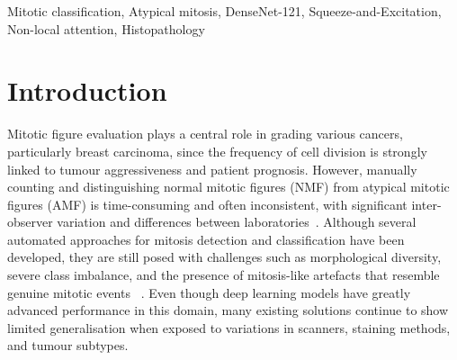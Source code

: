 \documentclass[conference]{IEEEtran}
\begin{document}
\maketitle

\begin{abstract}
Atypical mitotic figures (AMF) are valuable biomarkers for assessing tumour aggressiveness, but accurately detecting them is difficult because they appear infrequently and often differ only subtly from normal mitoses in histopathology images. To address this challenge, this work introduces an attention-augmented deep learning framework built on a DenseNet-121 backbone and trained using the curated MIDOG Mitotic Figures Binary Classification Dataset. Several baseline CNNs and attention modules - CBAM, CCA, ECA, PSA, and Squeeze-and-Excitation (SE) - were evaluated, with SE consistently delivering the best performance when applied before global average pooling. A compact SE1D non-local attention block was also inserted at various depths of DenseNet-121 to determine the most effective placement, with Position 3 providing the highest gains. The final model, combining a global SE module with SE1D at Position 3, reached an accuracy of $89.17\%$, a precision of $89.91\%$, and an F1-score of $89.08\%$, outperforming all other configurations. These outcomes underscore importance of strategically placed channel-attention mechanisms for classification of mitotic subtypes.
\end{abstract}


\vspace{1em}  

\renewcommand\IEEEkeywordsname{Keywords}
\begin{IEEEkeywords}
Mitotic classification, Atypical mitosis, DenseNet-121, Squeeze-and-Excitation, Non-local attention, Histopathology

\end{IEEEkeywords}


\section{Introduction}
Mitotic figure evaluation plays a central role in grading various cancers, particularly breast carcinoma, since the frequency of cell division is strongly linked to tumour aggressiveness and patient prognosis. However, manually counting and distinguishing normal mitotic figures (NMF) from atypical mitotic figures (AMF) is time-consuming and often inconsistent, with significant inter-observer variation and differences between laboratories~\cite{Lin2024}. Although several automated approaches for mitosis detection and classification have been developed, they are still posed with challenges such as morphological diversity, severe class imbalance, and the presence of mitosis-like artefacts that resemble genuine mitotic events ~\cite{Kotte2022}. Even though deep learning models have greatly advanced performance in this domain, many existing solutions continue to show limited generalisation when exposed to variations in scanners, staining methods, and tumour subtypes.
\end{document}
